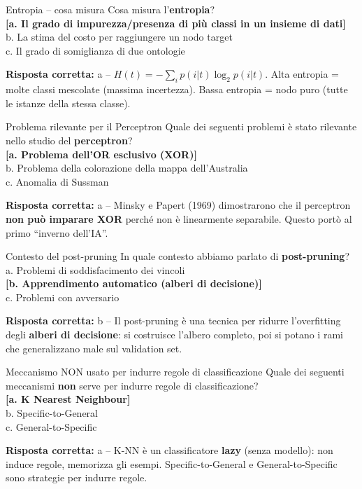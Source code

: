 \documentclass[12pt,a4paper]{article}
\newcommand{\corr}[1]{\textcolor{green!55!black}{\textbf{[#1]}}}
\newcommand{\risp}[1]{\begin{abox}\textbf{Risposta corretta: }#1\end{abox}}
\begin{document}
\bigskip
\begin{qbox}{Entropia -- cosa misura}
Cosa misura l'\textbf{entropia}?
\\[4pt]
\corr{a. Il grado di impurezza/presenza di più classi in un insieme di dati}\\
b. La stima del costo per raggiungere un nodo target\\
c. Il grado di somiglianza di due ontologie
\end{qbox}
\risp{a -- $H(t) = -\sum_i p(i|t)\log_2 p(i|t)$. Alta entropia = molte classi mescolate (massima incertezza). Bassa entropia = nodo puro (tutte le istanze della stessa classe).}

\bigskip
\begin{qbox}{Problema rilevante per il Perceptron}
Quale dei seguenti problemi è stato rilevante nello studio del \textbf{perceptron}?
\\[4pt]
\corr{a. Problema dell'OR esclusivo (XOR)}\\
b. Problema della colorazione della mappa dell'Australia\\
c. Anomalia di Sussman
\end{qbox}
\risp{a -- Minsky e Papert (1969) dimostrarono che il perceptron \textbf{non può imparare XOR} perché non è linearmente separabile. Questo portò al primo ``inverno dell'IA''.}

\bigskip
\begin{qbox}{Contesto del post-pruning}
In quale contesto abbiamo parlato di \textbf{post-pruning}?
\\[4pt]
a. Problemi di soddisfacimento dei vincoli\\
\corr{b. Apprendimento automatico (alberi di decisione)}\\
c. Problemi con avversario
\end{qbox}
\risp{b -- Il post-pruning è una tecnica per ridurre l'overfitting degli \textbf{alberi di decisione}: si costruisce l'albero completo, poi si potano i rami che generalizzano male sul validation set.}

\bigskip
\begin{qbox}{Meccanismo NON usato per indurre regole di classificazione}
Quale dei seguenti meccanismi \textbf{non} serve per indurre regole di classificazione?
\\[4pt]
\corr{a. K Nearest Neighbour}\\
b. Specific-to-General\\
c. General-to-Specific
\end{qbox}
\risp{a -- K-NN è un classificatore \textbf{lazy} (senza modello): non induce regole, memorizza gli esempi. Specific-to-General e General-to-Specific sono strategie per indurre regole.}
\end{document}
